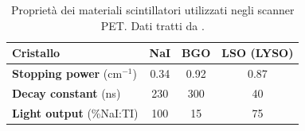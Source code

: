 \begin{table}[tbh]
	\centering
	\begin{tabular}{l|ccc}
		\hline
		\textbf{Cristallo} & NaI & BGO & LSO (LYSO) \\ \hline
		\textbf{Stopping power} ($\unit{\centi\meter}^{-1}$) & 0.34 & 0.92 & 0.87  \\ \hline
		\textbf{Decay constant} (\unit{\nano\second}) & 230 & 300 & 40 \\ \hline
		\textbf{Light output} (\%NaI:TI) & 100 & 15 & 75 \\ \hline
	\end{tabular}
	\caption{Proprietà dei materiali scintillatori utilizzati negli scanner PET. Dati tratti da \cite{RamseyDerek}.}
	\label{tab:scintillator_properties}
\end{table}

